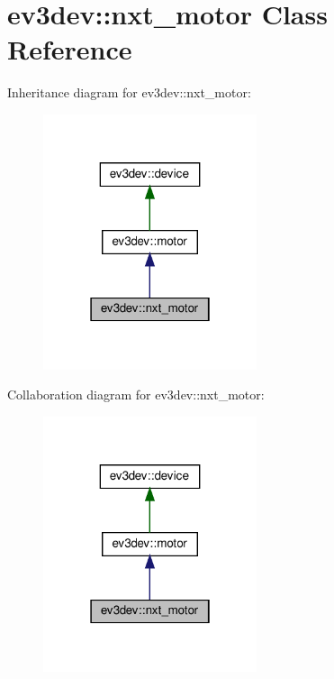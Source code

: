 \hypertarget{classev3dev_1_1nxt__motor}{}\section{ev3dev\+:\+:nxt\+\_\+motor Class Reference}
\label{classev3dev_1_1nxt__motor}


Inheritance diagram for ev3dev\+:\+:nxt\+\_\+motor\+:
\nopagebreak
\begin{figure}[H]
\begin{center}
\leavevmode
\includegraphics[width=178pt]{classev3dev_1_1nxt__motor__inherit__graph}
\end{center}
\end{figure}


Collaboration diagram for ev3dev\+:\+:nxt\+\_\+motor\+:
\nopagebreak
\begin{figure}[H]
\begin{center}
\leavevmode
\includegraphics[width=178pt]{classev3dev_1_1nxt__motor__coll__graph}
\end{center}
\end{figure}
